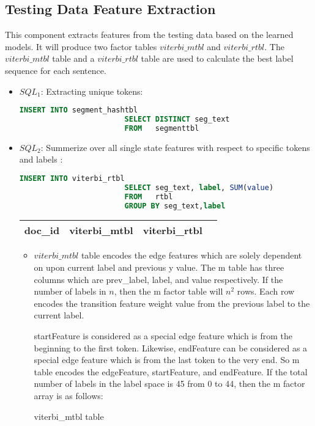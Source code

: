 \subsection{Testing Data Feature Extraction}
  This component extracts features from the testing data based on the learned models.
  It will produce two factor tables
  $viterbi\_mtbl$ and  $viterbi\_rtbl$. The $viterbi\_mtbl$
  table and a $viterbi\_rtbl$ table are used to calculate the best label
  sequence for each sentence.
\begin{itemize}
\item $SQL_1$: Extracting unique tokens:\\
              \begin{lstlisting}[language=SQL,gobble=4]
                        INSERT INTO segment_hashtbl
                        SELECT DISTINCT seg_text
                        FROM   segmenttbl
              \end{lstlisting}

\item $SQL_2$: Summerize over all single state features with respect to specific tokens and labels :\\
              \begin{lstlisting}[language=SQL,gobble=4]
                        INSERT INTO viterbi_rtbl
                        SELECT seg_text, label, SUM(value)
                        FROM   rtbl
                        GROUP BY seg_text,label
              \end{lstlisting}
\begin{center}
    \begin{tabular}{ | l | l | l | l |}
    \hline
    doc\_id & viterbi\_mtbl & viterbi\_rtbl \\ 
    \hline
    \end{tabular}
\end{center}

  \begin{itemize}
  \item 
  $viterbi\_mtbl$ table
  encodes the edge features which are solely dependent on upon current label and
  previous y value. The m table has three columns which are prev\_label, label,
  and value respectively.
  If the number of labels in $n$, then the m factor table will $n^2$
  rows. Each row encodes the transition feature weight value from the previous label
  to the current label.
 
  startFeature is considered as a special edge feature which is from the
  beginning to the first token. Likewise, endFeature can be considered
  as a special edge feature which is from the last token to the very end.
  So m table encodes the edgeFeature, startFeature, and endFeature.
  If the total number of labels in the label space is 45 from 0 to 44,
  then the m factor array is as follows:
\begin {table}[h]
\caption {viterbi\_mtbl table} \label{tab:title} 
 

\end{table}
\end{itemize}
\end{itemize}
